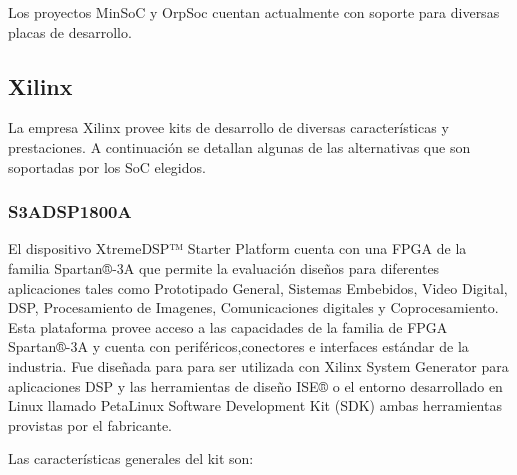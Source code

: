  Los proyectos MinSoC y OrpSoc cuentan actualmente con soporte para diversas placas de desarrollo. 

				\subsection{Xilinx}
				La empresa Xilinx provee kits de desarrollo de diversas características y prestaciones. A continuación se detallan algunas de las alternativas que
				son soportadas por los SoC elegidos.
				\subsubsection{S3ADSP1800A}
				El dispositivo XtremeDSP™ Starter Platform cuenta con una FPGA de la familia Spartan®-3A que permite la evaluación diseños para diferentes
				aplicaciones tales como Prototipado General, Sistemas Embebidos, Video Digital, DSP, Procesamiento de Imagenes, Comunicaciones digitales y
				Coprocesamiento. Esta plataforma provee acceso a las capacidades de la familia de FPGA Spartan®-3A y cuenta con periféricos,conectores e
				interfaces estándar de la industria. Fue diseñada para para ser utilizada con Xilinx System Generator para aplicaciones DSP y las herramientas de
				diseño ISE® o el entorno desarrollado en Linux llamado PetaLinux Software Development Kit (SDK) ambas herramientas provistas por el fabricante. 
				
				Las características generales del kit son:
			
